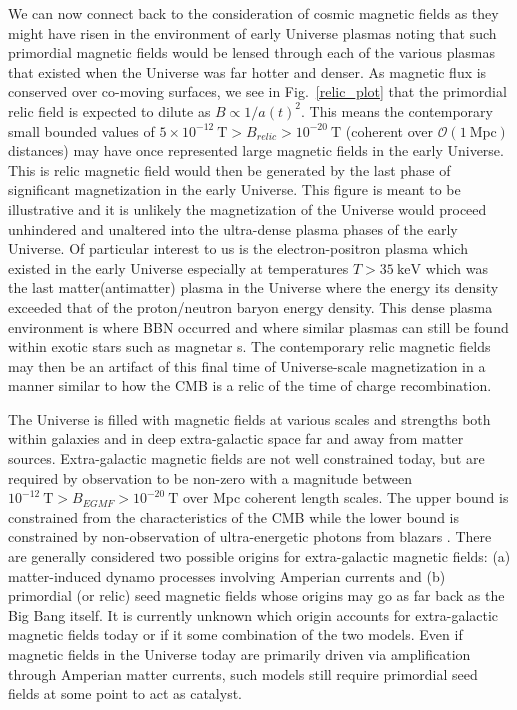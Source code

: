 \documentclass[universe,article,submit,moreauthors,pdftex,a4paper]{Definitions/mdpi}
\newcommand*{\rf}[1]{Fig.~{\ref{#1}}}
\begin{document}
We can now connect back to the consideration of cosmic magnetic fields as they might have risen in the environment of early Universe plasmas noting that such primordial magnetic fields would be lensed through each of the various plasmas that existed when the Universe was far hotter and denser. As magnetic flux is conserved over co-moving surfaces, we see in \rf{relic_plot} that the primordial relic field is expected to dilute as $B\propto1/a(t)^{2}$. This means the contemporary small bounded values of $5\times10^{-12}\ \mathrm{T}>B_{relic}>10^{-20}\ \mathrm{T}$ (coherent over $\mathcal{O}(1\ \mathrm{Mpc})$ distances) may have once represented large magnetic fields in the early Universe. This is relic magnetic field would then be generated by the last phase of significant magnetization in the early Universe. This figure is meant to be illustrative and it is unlikely the magnetization of the Universe would proceed unhindered and unaltered into the ultra-dense plasma phases of the early Universe. Of particular interest to us is the electron-positron plasma which existed in the early Universe especially at temperatures $T>35\ \mathrm{keV}$ which was the last matter(antimatter) plasma in the Universe where the energy its density exceeded that of the proton/neutron baryon energy density. This dense plasma environment is where BBN occurred and where similar plasmas can still be found within exotic stars such as magnetar \cite{Broderick:2000pe}s. The contemporary relic magnetic fields may then be an artifact of this final time of Universe-scale magnetization in a manner similar to how the CMB is a relic of the time of charge recombination.

The Universe is filled with magnetic fields \cite{Kronberg:1993vk} at various scales and strengths both within galaxies and in deep extra-galactic space far and away from matter sources. Extra-galactic magnetic fields are not well constrained today, but are required by observation to be non-zero \cite{Anchordoqui:2001bs,Widrow:2002ud} with a magnitude between $10^{-12}\ \mathrm{T}>B_{EGMF}>10^{-20}\ \mathrm{T}$ over Mpc coherent length scales. The upper bound is constrained from the characteristics of the CMB while the lower bound is constrained by non-observation of ultra-energetic photons from blazars \cite{Neronov:2010gir}. There are generally considered two possible origins \cite{Widrow:2011hs,Vazza:2021vwy} for extra-galactic magnetic fields: (a) matter-induced dynamo processes involving Amperian currents and (b) primordial (or relic) seed magnetic fields whose origins may go as far back as the Big Bang itself. It is currently unknown which origin accounts for extra-galactic magnetic fields today or if it some combination of the two models. Even if magnetic fields in the Universe today are primarily driven via amplification through Amperian matter currents, such models still require primordial seed fields at some point to act as catalyst.
\end{document}
